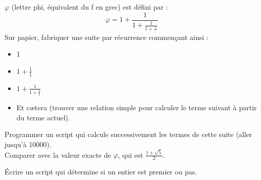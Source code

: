 \begin{exercice}
    $\varphi$ (lettre phi, équivalent du \og f \fg{} en grec) est défini par : $$\varphi=1+\frac{1}{1+\frac{1}{1+\frac{1}{\ldots}}}$$
    Sur papier, fabriquer une suite par récurrence commençant ainsi :
    \begin{itemize}
        \item   1
        \item   $1+\frac{1}{1}$
        \item   $1+\frac{1}{1+\frac{1}{1}}$
        \item   Et c\ae tera (trouver une relation simple pour calculer le terme suivant à partir du terme actuel).
    \end{itemize}
    Programmer un script qui calcule successivement les termes de cette suite (aller jusqu'à 10000\eme).\\
    
    Comparer avec la valeur exacte de $\varphi$, qui est $\frac{1+\sqrt{5}}{2}$.
\end{exercice}

\begin{exercice}
    \'Ecrire un script qui détermine si un entier est premier ou pas.
\end{exercice}